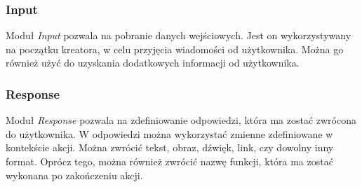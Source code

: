 \subsubsection{Input}
Moduł \textit{Input} pozwala na pobranie danych wejściowych. Jest on wykorzystywany na początku kreatora, w celu przyjęcia wiadomości od użytkownika. Można go również użyć do uzyskania dodatkowych informacji od użytkownika.

\subsubsection{Response}
Moduł \textit{Response} pozwala na zdefiniowanie odpowiedzi, która ma zostać zwrócona do użytkownika. W odpowiedzi można wykorzystać zmienne zdefiniowane w kontekście akcji. Można zwrócić tekst, obraz, dźwięk, link, czy dowolny inny format. Oprócz tego, można również zwrócić nazwę funkcji, która ma zostać wykonana po zakończeniu akcji.